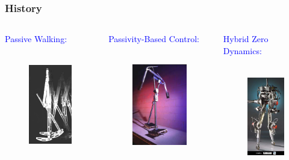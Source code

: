 \documentclass{beamer}
\begin{document}
\begin{frame}
  \frametitle{History}
  \begin{columns}

    \begin{column}{.24\textwidth}
      \textcolor{blue}{Passive Walking:}
      \begin{figure}
        \centering
        \includegraphics[height=4.5cm]{bipeds_ruina}
      \end{figure}
    \end{column}

    \begin{column}{.24\textwidth}
      \textcolor{blue}{Passivity-Based Control:}
      \begin{figure}
        \centering
        \includegraphics[height=4.5cm]{bipeds_collins}
      \end{figure}
    \end{column}

    \begin{column}{.24\textwidth}
      \textcolor{blue}{Hybrid Zero Dynamics:}
      \begin{figure}
        \centering
        \includegraphics[height=4.5cm]{figures/bipeds_grizzle}
      \end{figure}
    \end{column}


\end{columns}
\end{frame}
\end{document}
